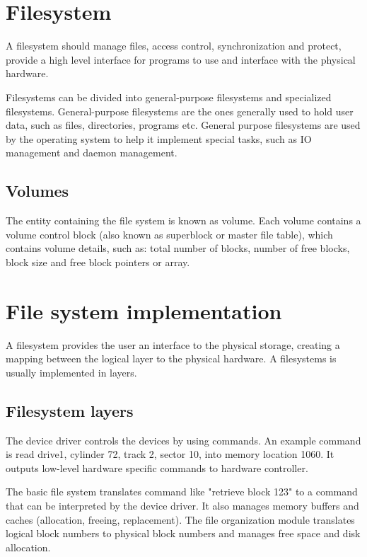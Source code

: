 \section{Filesystem}
A filesystem should manage files, access control, synchronization and protect, provide a high level interface for programs to use and interface with the physical hardware.

Filesystems can be divided into general-purpose filesystems and specialized filesystems. General-purpose filesystems are the ones generally used to hold user data, such as files, directories, programs etc. General purpose filesystems are used by the operating system to help it implement special tasks, such as IO management and daemon management.

\subsection{Volumes}
The entity containing the file system is known as volume. Each volume contains a volume control block (also known as superblock or master file table), which contains volume details, such as: total number of blocks, number of free blocks, block size and free block pointers or array.

\section{File system implementation}
A filesystem provides the user an interface to the physical storage, creating a mapping between the logical layer to the physical hardware. A filesystems is usually implemented in layers.


\subsection{Filesystem layers}
The device driver controls the devices by using commands. An example command is read drive1, cylinder 72, track 2, sector 10, into memory location 1060. It outputs low-level hardware specific commands to hardware
controller.

The basic file system translates command like "retrieve block 123" to a command that can be interpreted by the device driver. It also manages memory buffers and caches (allocation, freeing, replacement). The file organization module translates logical block numbers to physical block numbers and manages free space and disk allocation. 

